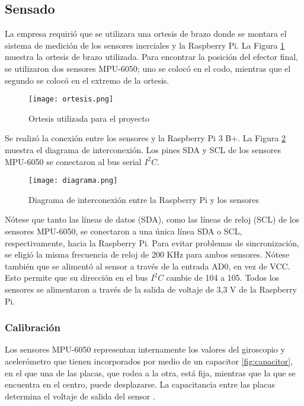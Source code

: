 \subsection{Sensado}

La empresa requirió que se utilizara una ortesis de brazo donde se montara el sistema de medición de los sensores inerciales y la Raspberry Pi. La Figura \ref{fig:ortesis} muestra la ortesis de brazo utilizada. Para encontrar la posición del efector final, se utilizaron dos sensores MPU-6050; uno se colocó en el codo, mientras que el segundo se colocó en el extremo de la ortesis.

\begin{figure}[htb]
	\centering
	{\texttt{[image: ortesis.png]}}
	\caption{Ortesis utilizada para el proyecto}
	\label{fig:ortesis}
\end{figure}

Se realizó la conexión entre los sensores y la Raspberry Pi 3 B+. La Figura \ref{fig:diagrama} muestra el diagrama de interconexión. Los pines SDA y SCL de los sensores MPU-6050 se conectaron al bus serial $I^2C$.

\begin{figure}[htb]
	\centering
	\texttt{[image: diagrama.png]}
	\caption{Diagrama de interconexión entre la Raspberry Pi y los sensores}
	\label{fig:diagrama}
\end{figure}

Nótese que tanto las líneas de datos (SDA), como las líneas de reloj (SCL) de los sensores MPU-6050, se conectaron a una única línea SDA o SCL, respectivamente, hacia la Raspberry Pi. Para evitar problemas de sincronización, se eligió la misma frecuencia de reloj de 200 KHz para ambos sensores. Nótese también que se alimentó al sensor a través de la entrada AD0, en vez de VCC. Esto permite que su dirección en el bus $I^2C$ cambie de 104 a 105. Todos los sensores se alimentaron a través de la salida de voltaje de 3,3 V de la Raspberry Pi.

\subsubsection{Calibración}

Los sensores MPU-6050 representan internamente los valores del giroscopio y acelerómetro que tienen incorporados por medio de un capacitor \ref{fig:capacitor}, en el que una de las placas, que rodea a la otra, está fija, mientras que la que se encuentra en el centro, puede desplazarse. La capacitancia entre las placas determina el voltaje de salida del sensor \cite{MEMS}.

